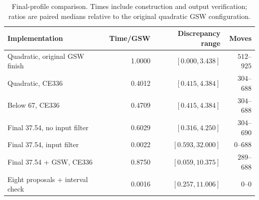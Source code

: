 \begin{table}[htbp]
\centering\small
\caption{Final-profile comparison. Times include construction and output verification; ratios are paired medians relative to the original quadratic GSW configuration.}
\label{tab:final-comparison}
\begin{tabular}{@{}lrrr@{}}
\toprule
Implementation & Time/GSW & Discrepancy range & Moves\\
\midrule
Quadratic, original GSW finish & 1.0000 & $[0.000,3.438]$ & $512$--$925$\\
Quadratic, CE336 & 0.4012 & $[0.415,4.384]$ & $304$--$688$\\
Below 67, CE336 & 0.4709 & $[0.415,4.384]$ & $304$--$688$\\
Final 37.54, no input filter & 0.6029 & $[0.316,4.250]$ & $304$--$690$\\
Final 37.54, input filter & 0.0022 & $[0.593,32.000]$ & $0$--$688$\\
Final 37.54 + GSW, CE336 & 0.8750 & $[0.059,10.375]$ & $289$--$688$\\
Eight proposals + interval check & 0.0016 & $[0.257,11.006]$ & $0$--$0$\\
\bottomrule
\end{tabular}
\end{table}
